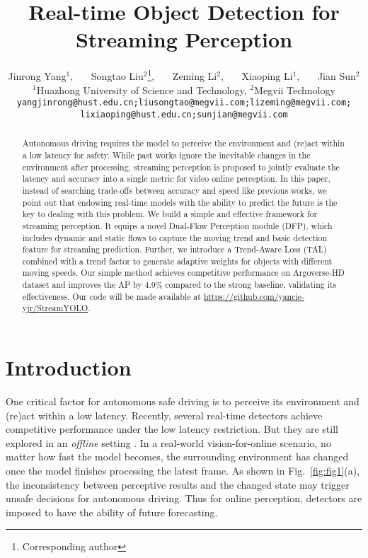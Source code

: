 \documentclass[10pt,twocolumn,letterpaper]{article}
\begin{document}
\title{Real-time Object Detection for Streaming Perception}

\author{Jinrong Yang$^{1}$,~~~ Songtao Liu$^2$\thanks{Corresponding author},~~~ Zeming Li$^2$,~~~ Xiaoping Li$^1$,~~~ Jian Sun$^2$\\
$^1$Huazhong University of Science and Technology, $^2$Megvii Technology\\
\tt\small yangjinrong@hust.edu.cn;liusongtao@megvii.com;lizeming@megvii.com;
\\
\tt\small lixiaoping@hust.edu.cn;sunjian@megvii.com}

\maketitle
\begin{abstract}
   Autonomous driving requires the model to perceive the environment and (re)act within a low latency for safety. While past works ignore the inevitable changes in the environment after processing, streaming perception is proposed to jointly evaluate the latency and accuracy into a single metric for video online perception. In this paper, instead of searching trade-offs between accuracy and speed like previous works, we point out that endowing real-time models with the ability to predict the future is the key to dealing with this problem. We build a simple and effective framework for streaming perception. It equips a novel Dual-Flow Perception module (DFP), which includes dynamic and static flows to capture the moving trend and basic detection feature for streaming prediction. Further, we introduce a Trend-Aware Loss (TAL) combined with a trend factor to generate adaptive weights for objects with different moving speeds. Our simple method achieves competitive performance on Argoverse-HD dataset and improves the AP by 4.9\% compared to the strong baseline, validating its effectiveness. Our code will be made available at \url{https://github.com/yancie-yjr/StreamYOLO}.
   
\end{abstract}

\section{Introduction}
\label{sec:intro}

One critical factor for autonomous safe driving is to perceive its environment and (re)act within a low latency. 
Recently, several real-time detectors \cite{yolo1,yolo2,yolo3,yolo4,yolo5,yolox,rfb,asff} achieve competitive performance under the low latency restriction. But they are still explored in an \emph{offline} setting \cite{streamer}. In a real-world vision-for-online scenario, no matter how fast the model becomes, the surrounding environment has changed once the model finishes processing the latest frame. As shown in Fig.~\ref{fig:fig1}(a), the inconsistency between perceptive results and the changed state may trigger unsafe decisions for autonomous driving. Thus for online perception, detectors are imposed to have the ability of future forecasting. 
\end{document}

